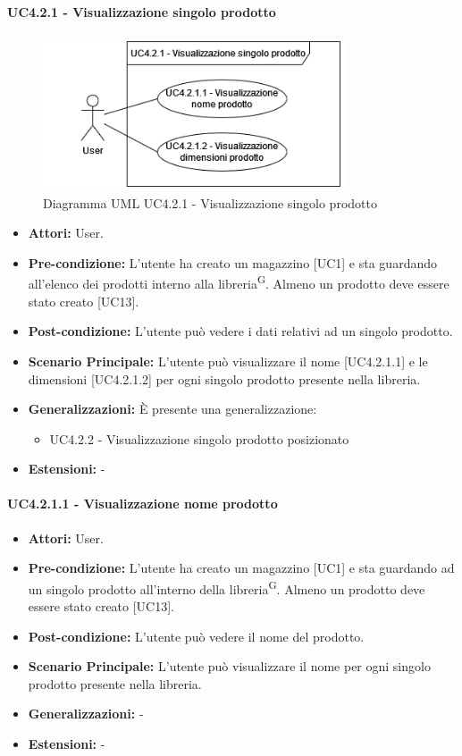 \paragraph{UC4.2.1 - Visualizzazione singolo prodotto}
\begin{figure}[H]
  \centering
  \includegraphics[width=0.8\textwidth]{UC_diagrams_1-10/UC4.2.1.drawio.png}
   \caption{Diagramma UML UC4.2.1 - Visualizzazione singolo prodotto}
\end{figure}
\begin{itemize} 
    \item \textbf{Attori:} User.
    \item \textbf{Pre-condizione:}  L'utente ha creato un magazzino [UC1] e sta guardando all'elenco dei prodotti interno alla libreria\textsuperscript{G}. Almeno un prodotto deve essere stato creato [UC13].
    \item \textbf{Post-condizione:} L'utente può vedere i dati relativi ad un singolo prodotto.
    \item \textbf{Scenario Principale:} L'utente può visualizzare il nome [UC4.2.1.1] e le dimensioni [UC4.2.1.2] per ogni singolo prodotto presente nella libreria. 
    \item \textbf{Generalizzazioni:} È presente una generalizzazione:
    \begin{itemize}
        \item UC4.2.2 - Visualizzazione singolo prodotto posizionato
    \end{itemize}
    \item \textbf{Estensioni:} -
\end{itemize}


\paragraph{UC4.2.1.1 - Visualizzazione nome prodotto}
\begin{itemize} 
    \item \textbf{Attori:} User.
    \item \textbf{Pre-condizione:}  L'utente ha creato un magazzino [UC1] e sta guardando ad un singolo prodotto all'interno della libreria\textsuperscript{G}. Almeno un prodotto deve essere stato creato [UC13].
    \item \textbf{Post-condizione:} L'utente può vedere il nome del prodotto.
    \item \textbf{Scenario Principale:} L'utente può visualizzare il nome per ogni singolo prodotto presente nella libreria. 
    \item \textbf{Generalizzazioni:} -
    \item \textbf{Estensioni:} -
\end{itemize}


